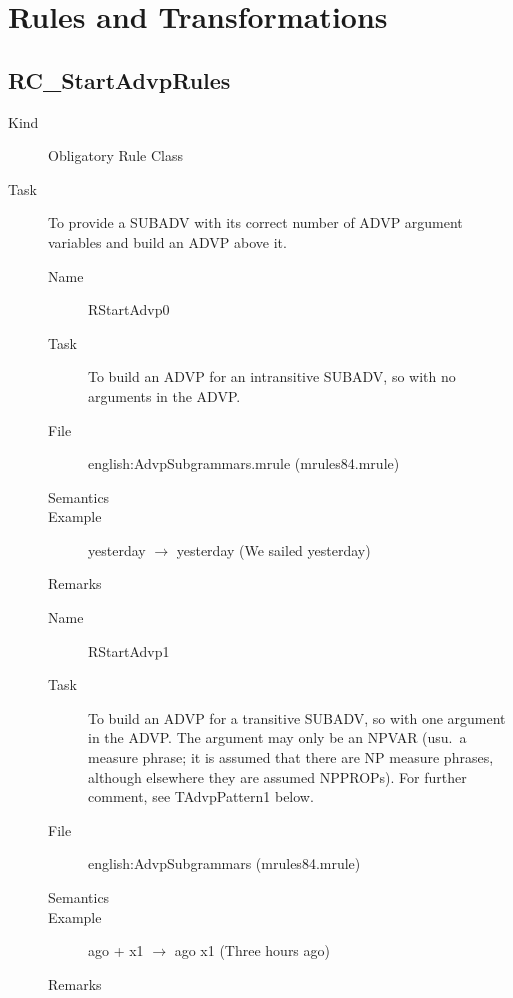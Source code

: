 \newpage
\section{Rules and Transformations}

\subsection{RC\_StartAdvpRules}
\begin{description}
\item[Kind] Obligatory Rule Class
\item[Task] To provide a SUBADV with its correct number of ADVP argument 
variables and build an ADVP above it. 

\vspace{1 cm}
\begin{description}
\item[Name] RStartAdvp0
\item[Task] To build an ADVP for an intransitive SUBADV, so with no arguments 
in the ADVP.
\item[File] english:AdvpSubgrammars.mrule (mrules84.mrule)
\item[Semantics]
\item[Example] yesterday $\rightarrow$ yesterday (We sailed yesterday)
\item[Remarks]
\end{description}

\vspace{1 cm}
\begin{description}
\item[Name] RStartAdvp1
\item[Task] To build an ADVP for a transitive SUBADV, so with one argument in 
the ADVP. The argument may only be an NPVAR (usu.\ a measure phrase; it is 
assumed that there are NP measure phrases, although elsewhere they are assumed 
NPPROPs). For further comment, see TAdvpPattern1 below.
\item[File] english:AdvpSubgrammars (mrules84.mrule)
\item[Semantics]
\item[Example] ago + x1 $\rightarrow$ ago x1 (Three hours ago)
\item[Remarks]
\end{description}

\end{description}

\newpage
